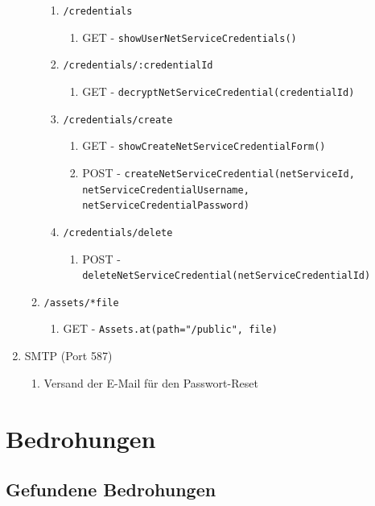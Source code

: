 \documentclass[12pt,DIV14,BCOR10mm,a4paper,parskip=half-,headsepline,headinclude,english,ngerman,bibliography=totocnumbered]{scrreprt}
\begin{document}
\begin{enumerate}
\begin{enumerate}
\begin{enumerate}
     \item \texttt{/credentials}
      \begin{enumerate}
        \item GET - \texttt{showUserNetServiceCredentials()}
      \end{enumerate}
      \item \texttt{/credentials/:credentialId}
      \begin{enumerate}
        \item GET - \texttt{decryptNetServiceCredential(credentialId)}
      \end{enumerate}
      \item \texttt{/credentials/create}
      \begin{enumerate}
        \item GET - \texttt{showCreateNetServiceCredentialForm()}
        \item POST - \texttt{createNetServiceCredential(netServiceId,\\netServiceCredentialUsername, netServiceCredentialPassword)}
      \end{enumerate}
      \item \texttt{/credentials/delete}
      \begin{enumerate}
        \item POST - \texttt{deleteNetServiceCredential(netServiceCredentialId)}
      \end{enumerate}
    \end{enumerate}

  \item \texttt{/assets/*file}
    \begin{enumerate}
      \item GET - \texttt{Assets.at(path="/public", file)}
    \end{enumerate}
  \end{enumerate}
  \item SMTP (Port 587)
  \begin{enumerate}
    \item Versand der E-Mail für den Passwort-Reset
  \end{enumerate}
\end{enumerate}

\chapter{Bedrohungen}
\section{Gefundene Bedrohungen}
\end{document}

